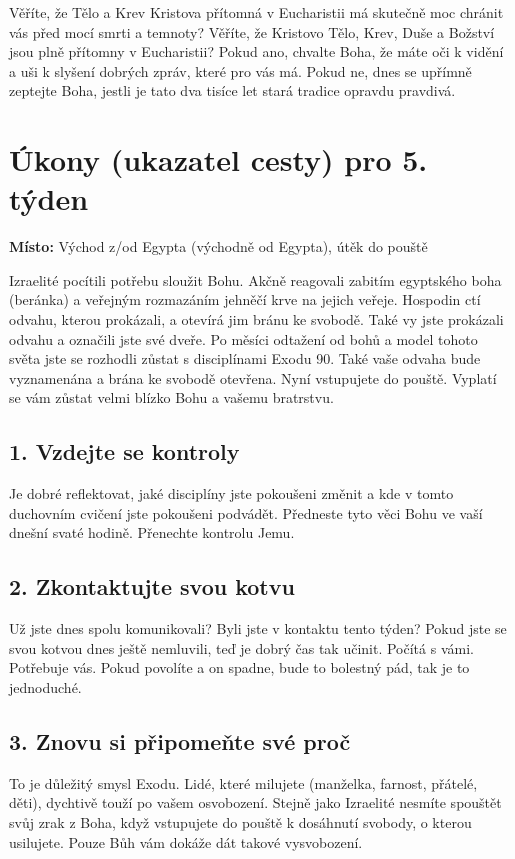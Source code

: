 \documentclass[11pt]{article}
\begin{document}
Věříte, že Tělo a Krev Kristova přítomná v Eucharistii má skutečně moc chránit vás před mocí smrti a
temnoty? Věříte, že Kristovo Tělo, Krev, Duše a Božství jsou plně přítomny v Eucharistii? Pokud ano,
chvalte Boha, že máte oči k vidění a uši k slyšení dobrých zpráv, které pro vás má. Pokud ne, dnes se
upřímně zeptejte Boha, jestli je tato dva tisíce let stará tradice opravdu pravdivá.


\newpage
\section*{Úkony (ukazatel cesty) pro 5. týden}

\textbf{Místo:} Východ z/od Egypta (východně od Egypta), útěk do pouště

Izraelité pocítili potřebu sloužit Bohu. Akčně reagovali zabitím egyptského boha (beránka) a veřejným rozmazáním jehněčí krve na jejich veřeje. Hospodin ctí odvahu, kterou prokázali, a otevírá jim bránu ke svobodě. Také vy jste prokázali odvahu a označili jste své dveře. Po měsíci odtažení od bohů a model tohoto světa jste se rozhodli zůstat s disciplínami Exodu 90. Také vaše odvaha bude vyznamenána a brána ke svobodě otevřena. Nyní vstupujete do pouště. Vyplatí se vám zůstat velmi blízko Bohu a vašemu bratrstvu. 


\subsection*{1. Vzdejte se kontroly}
Je dobré reflektovat, jaké disciplíny jste pokoušeni změnit a kde v tomto duchovním cvičení jste pokoušeni podvádět. Předneste tyto věci Bohu ve vaší dnešní svaté hodině. Přenechte kontrolu Jemu.
\subsection*{2. Zkontaktujte svou kotvu}
Už jste dnes spolu komunikovali? Byli jste v kontaktu tento týden? Pokud jste se svou kotvou dnes ještě nemluvili, teď je dobrý čas tak učinit. Počítá s vámi. Potřebuje vás. Pokud povolíte a on spadne, bude to bolestný pád, tak je to jednoduché.
\subsection*{3. Znovu si připomeňte své proč}
To je důležitý smysl Exodu. Lidé, které milujete (manželka, farnost, přátelé, děti), dychtivě touží po vašem osvobození. Stejně jako Izraelité nesmíte spouštět svůj zrak z Boha, když vstupujete do pouště k dosáhnutí svobody, o kterou usilujete. Pouze Bůh vám dokáže dát takové vysvobození.
\end{document}
